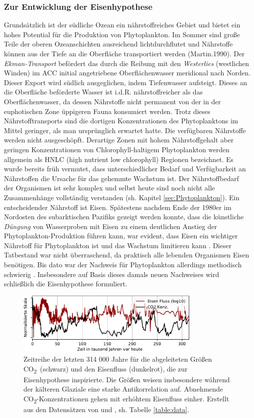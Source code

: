 \documentclass[12pt,a4paper,onecolumn,headheight=30pt]{scrartcl}
\newcommand{\cotwo}{CO\textsubscript{2}}
\begin{document}
\subsubsection{Zur Entwicklung der Eisenhypothese}
Grundsätzlich ist der südliche Ozean ein nährstoffreiches Gebiet und
bietet ein hohes Potential für die Produktion von Phytoplankton. Im Sommer sind große Teile der oberen Ozeanschichten ausreichend lichtdurchflutet und Nährstoffe können aus der Tiefe an die Oberfläche transportiert werden (Martin.1990). Der \textit{Ekman-Transport} befördert das durch die Reibung mit den \textit{Westerlies} (westlichen Winden) im ACC initial angetriebene Oberflächenwasser meridional nach Norden. Dieser Export wird südlich ausgeglichen, indem Tiefenwasser aufsteigt. Dieses an die Oberfläche beförderte Wasser ist i.d.R. nährstoffreicher als das Oberflächenwasser, da dessen Nährstoffe nicht permanent von der in der euphotischen Zone üppigeren Fauna konsumiert werden. Trotz dieses Nährstofftransports sind die dortigen Konzentrationen des Phytoplanktons im Mittel geringer, als man ursprünglich erwartet hatte. Die verfügbaren Nährstoffe werden nicht ausgeschöpft. Derartige Zonen mit hohem Nährstoffgehalt aber geringen Konzentrationen von Chlorophyll-haltigem Phytoplankton werden allgemein als HNLC (high nutrient low chlorophyll) Regionen bezeichnet. Es wurde bereits früh vermutet, dass unterschiedlicher Bedarf und Verfügbarkeit an Nährstoffen die Ursache für das gehemmte Wachstum ist. Der Nährstoffbedarf der Organismen ist sehr komplex und selbst heute sind noch nicht alle Zusammenhänge vollständig verstanden (sh. Kapitel \ref{sec:Phytoplankton}). Ein entscheidender Nährstoff ist Eisen. Spätestens nachdem Ende der 1980er im Nordosten des subarktischen Pazifiks gezeigt werden konnte, dass die künstliche \textit{Düngung} von Wasserproben mit Eisen zu einem deutlichen Anstieg der Phytoplankton-Produktion führen kann, war evident, dass Eisen ein wichtiger Nährstoff für Phytoplankton ist und das Wachstum limitieren kann \citep{Martin.1988}. Dieser Tatbestand war nicht überraschend, da praktisch alle lebenden Organismen Eisen benötigen. Bis dato war der Nachweis für Phytoplankton allerdings methodisch schwierig \citep{Martin.1988}. Insbesondere auf Basis dieses damals neuen Nachweises wird schließlich die Eisenhypothese formuliert.
\begin{figure}[htbp]
\centering
\includegraphics[width=0.8\textwidth]{bilder/co2_iron.pdf}
\caption{Zeitreihe der letzten 314 000 Jahre für die abgeleiteten Größen \cotwo \ (schwarz) und den Eisenfluss (dunkelrot), die zur Eisenhypothese inspirierte. Die Größen weisen insbesondere während der kälteren Glaziale eine starke Antikorrelation auf. Abnehmende \cotwo -Konzentrationen gehen mit erhöhtem Eisenfluss einher. Erstellt aus den Datensätzen von \cite{Bereiter.2015} und \cite{Vallelonga.2013}, sh. Tabelle \ref{table:data}.}   \label{fig:co2iron}
\end{figure}
\end{document}
